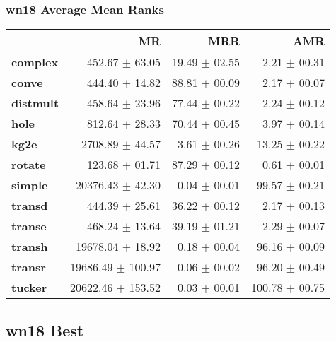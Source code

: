 \documentclass{article}
\begin{document}
\subsubsection{wn18 Average Mean Ranks}
    \begin{center}
    \begin{tabular}{lrrr}
\toprule
{} &                 MR &            MRR &             AMR \\
\midrule
\textbf{complex } &     452.67 $\pm$ 63.05 &  19.49 $\pm$ 02.55 &    2.21 $\pm$ 00.31 \\
\textbf{conve   } &     444.40 $\pm$ 14.82 &  88.81 $\pm$ 00.09 &    2.17 $\pm$ 00.07 \\
\textbf{distmult} &     458.64 $\pm$ 23.96 &  77.44 $\pm$ 00.22 &    2.24 $\pm$ 00.12 \\
\textbf{hole    } &     812.64 $\pm$ 28.33 &  70.44 $\pm$ 00.45 &    3.97 $\pm$ 00.14 \\
\textbf{kg2e    } &    2708.89 $\pm$ 44.57 &   3.61 $\pm$ 00.26 &   13.25 $\pm$ 00.22 \\
\textbf{rotate  } &     123.68 $\pm$ 01.71 &  87.29 $\pm$ 00.12 &    0.61 $\pm$ 00.01 \\
\textbf{simple  } &   20376.43 $\pm$ 42.30 &   0.04 $\pm$ 00.01 &   99.57 $\pm$ 00.21 \\
\textbf{transd  } &     444.39 $\pm$ 25.61 &  36.22 $\pm$ 00.12 &    2.17 $\pm$ 00.13 \\
\textbf{transe  } &     468.24 $\pm$ 13.64 &  39.19 $\pm$ 01.21 &    2.29 $\pm$ 00.07 \\
\textbf{transh  } &   19678.04 $\pm$ 18.92 &   0.18 $\pm$ 00.04 &   96.16 $\pm$ 00.09 \\
\textbf{transr  } &  19686.49 $\pm$ 100.97 &   0.06 $\pm$ 00.02 &   96.20 $\pm$ 00.49 \\
\textbf{tucker  } &  20622.46 $\pm$ 153.52 &   0.03 $\pm$ 00.01 &  100.78 $\pm$ 00.75 \\
\bottomrule
\end{tabular}

    \end{center}
\subsection{wn18 Best}
\end{document}
